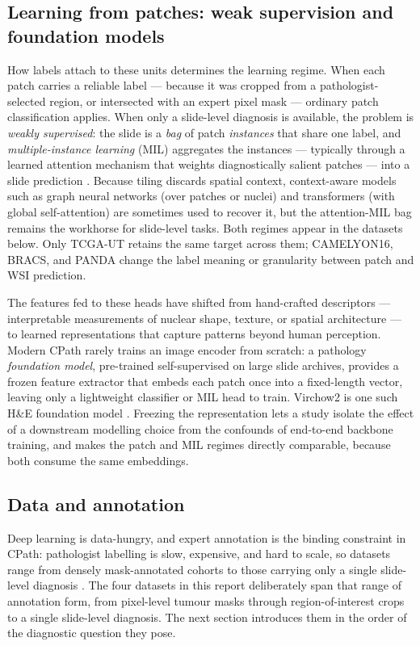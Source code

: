 \documentclass[11pt]{article}
\begin{document}
\subsection{Learning from patches: weak supervision and foundation models}
\label{sec:learning}
How labels attach to these units determines the learning regime. When each patch carries a reliable
label --- because it was cropped from a pathologist-selected region, or intersected with an expert
pixel mask --- ordinary patch classification applies. When only a slide-level diagnosis is
available, the problem is \emph{weakly supervised}: the slide is a \emph{bag} of patch
\emph{instances} that share one label, and \emph{multiple-instance learning} (MIL) aggregates the
instances --- typically through a learned attention mechanism that weights diagnostically salient
patches --- into a slide prediction \citep{song2023aiPathology,hosseini2024computationalPathology}.
Because tiling discards spatial context, context-aware models such as graph neural networks (over
patches or nuclei) and transformers (with global self-attention) are sometimes used to recover it,
but the attention-MIL bag remains the workhorse for slide-level tasks. Both regimes appear in the
datasets below. Only TCGA-UT retains the same target across them; CAMELYON16, BRACS, and PANDA
change the label meaning or granularity between patch and WSI prediction.

The features fed to these heads have shifted from hand-crafted descriptors --- interpretable
measurements of nuclear shape, texture, or spatial architecture --- to learned representations that
capture patterns beyond human perception. Modern CPath rarely trains an image encoder from scratch:
a pathology \emph{foundation model}, pre-trained self-supervised on large slide archives, provides a
frozen feature extractor that embeds each patch once into a fixed-length vector, leaving only a
lightweight classifier or MIL head to train. Virchow2 is one such H\&E foundation model
\citep{vorontsov2024virchow,zimmermann2024virchow2}. Freezing the representation lets a study isolate
the effect of a downstream modelling choice from the confounds of end-to-end backbone training, and
makes the patch and MIL regimes directly comparable, because both consume the same embeddings.

\subsection{Data and annotation}
\label{sec:data-challenge}
Deep learning is data-hungry, and expert annotation is the binding constraint in CPath: pathologist
labelling is slow, expensive, and hard to scale, so datasets range from densely mask-annotated
cohorts to those carrying only a single slide-level diagnosis
\citep{abels2019computationalPathology,hosseini2024computationalPathology}. The four datasets in this
report deliberately span that range of annotation form, from pixel-level tumour masks through
region-of-interest crops to a single slide-level diagnosis. The next section introduces them in the
order of the diagnostic question they pose.
\end{document}
